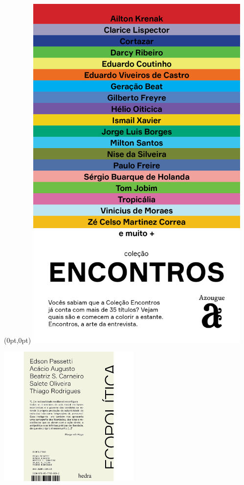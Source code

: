 \pagestyle{ayllon}
\label{ayllon}


\begin{textblock*}{5.625in}(0pt,0pt)%
\vspace*{-1.45cm}
\hspace*{-1.2cm}\includegraphics*[width=112mm]{./imgs/AZOUGUE.png}
\end{textblock*}

\pagebreak

\hspace{.5cm}

\begin{center}
\hspace*{-.5cm}\includegraphics[width=70mm]{eco.jpeg}
\end{center}

